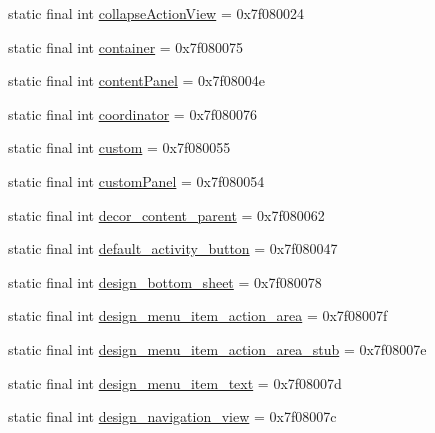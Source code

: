 \begin{CompactItemize}
\item 
static final int \hyperlink{classandroid_1_1support_1_1graphics_1_1drawable_1_1_r_1_1id_9d69cd26d661f19538224ddd8096d482}{collapseActionView} = 0x7f080024
\item 
static final int \hyperlink{classandroid_1_1support_1_1graphics_1_1drawable_1_1_r_1_1id_233e9b8e317378915a13b37122cf8fea}{container} = 0x7f080075
\item 
static final int \hyperlink{classandroid_1_1support_1_1graphics_1_1drawable_1_1_r_1_1id_0be0a8bf06a85836951ba36646fbe189}{contentPanel} = 0x7f08004e
\item 
static final int \hyperlink{classandroid_1_1support_1_1graphics_1_1drawable_1_1_r_1_1id_9c5829cb2024cee8d99620c29102e74f}{coordinator} = 0x7f080076
\item 
static final int \hyperlink{classandroid_1_1support_1_1graphics_1_1drawable_1_1_r_1_1id_329b91c97abd9ac147cf6bb5cb5c8a20}{custom} = 0x7f080055
\item 
static final int \hyperlink{classandroid_1_1support_1_1graphics_1_1drawable_1_1_r_1_1id_d8a0c8faedba19e39cedbabed538261b}{customPanel} = 0x7f080054
\item 
static final int \hyperlink{classandroid_1_1support_1_1graphics_1_1drawable_1_1_r_1_1id_ae5689bf194a673d515eba254454b070}{decor\_\-content\_\-parent} = 0x7f080062
\item 
static final int \hyperlink{classandroid_1_1support_1_1graphics_1_1drawable_1_1_r_1_1id_963cb90d730ac077259ffe73660f05b4}{default\_\-activity\_\-button} = 0x7f080047
\item 
static final int \hyperlink{classandroid_1_1support_1_1graphics_1_1drawable_1_1_r_1_1id_e951cdea21c92d2751dbfca1232aab76}{design\_\-bottom\_\-sheet} = 0x7f080078
\item 
static final int \hyperlink{classandroid_1_1support_1_1graphics_1_1drawable_1_1_r_1_1id_2555ba1bbe9a2c47e6d50e620c045c88}{design\_\-menu\_\-item\_\-action\_\-area} = 0x7f08007f
\item 
static final int \hyperlink{classandroid_1_1support_1_1graphics_1_1drawable_1_1_r_1_1id_a534ac811397afe2643e6ee192cc5813}{design\_\-menu\_\-item\_\-action\_\-area\_\-stub} = 0x7f08007e
\item 
static final int \hyperlink{classandroid_1_1support_1_1graphics_1_1drawable_1_1_r_1_1id_89fdfa6fa31d76d58549f7993d8eb9a9}{design\_\-menu\_\-item\_\-text} = 0x7f08007d
\item 
static final int \hyperlink{classandroid_1_1support_1_1graphics_1_1drawable_1_1_r_1_1id_1557b55a0a79b4e435ce60165dd76db2}{design\_\-navigation\_\-view} = 0x7f08007c

\end{CompactItemize}
